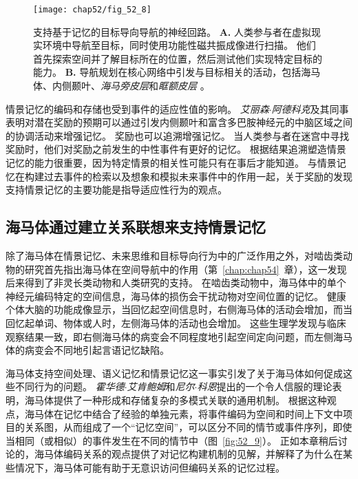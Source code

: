 \begin{figure}[htbp]
	\centering
	\texttt{[image: chap52/fig\_52\_8]}
	\caption{支持基于记忆的目标导向导航的神经回路\cite{brown2016prospective}。
		\textbf{A.} 人类参与者在虚拟现实环境中导航至目标，同时使用功能性磁共振成像进行扫描。
		他们首先探索空间并了解目标所在的位置，然后测试他们实现特定目标的能力。
		\textbf{B.} 导航规划在核心网络中引发与目标相关的活动，包括海马体、内侧颞叶、\textit{海马旁皮层}和\textit{眶额皮层 }。}
	\label{fig:52_8}
\end{figure}


情景记忆的编码和存储也受到事件的适应性值的影响。
\textit{艾丽森$\cdot$阿德科克}及其同事表明对潜在奖励的预期可以通过引发内侧颞叶和富含多巴胺神经元的中脑区域之间的协调活动来增强记忆。
奖励也可以追溯增强记忆。
当人类参与者在迷宫中寻找奖励时，他们对奖励之前发生的中性事件有更好的记忆。
根据结果​​追溯塑造情景记忆的能力很重要，因为特定情景的相关性可能只有在事后才能知道。
与情景记忆在构建过去事件的检索以及想象和模拟未来事件中的作用一起，关于奖励的发现支持情景记忆的主要功能是指导适应性行为的观点。



\subsection{海马体通过建立关系联想来支持情景记忆}

除了海马体在情景记忆、未来思维和目标导向行为中的广泛作用之外，对啮齿类动物的研究首先指出海马体在空间导航中的作用（第~\ref{chap:chap54}~章），这一发现后来得到了非灵长类动物和人类研究的支持。
在啮齿类动物中，海马体中的单个神经元编码特定的空间信息，海马体的损伤会干扰动物对空间位置的记忆。
健康个体大脑的功能成像显示，当回忆起空间信息时，右侧海马体的活动会增加，而当回忆起单词、物体或人时，左侧海马体的活动也会增加。
这些生理学发现与临床观察结果一致，即右侧海马体的病变会不同程度地引起空间定向问题，而左侧海马体的病变会不同地引起言语记忆缺陷。


海马体支持空间处理、语义记忆和情景记忆这一事实引发了关于海马体如何促成这些不同行为的问题。
\textit{霍华德$\cdot$艾肯鲍姆}和\textit{尼尔$\cdot$科恩}提出的一个令人信服的理论表明，海马体提供了一种形成和存储复杂的多模式关联的通用机制。
根据这种观点，海马体在记忆中结合了经验的单独元素，将事件编码为空间和时间上下文中项目的关系图，从而组成了一个“记忆空间”，可以区分不同的情节或事件序列，即使当相同（或相似）的事件发生在不同的情节中（图~\ref{fig:52_9}）。
正如本章稍后讨论的，海马体编码关系的观点提供了对记忆构建机制的见解，并解释了为什么在某些情况下，海马体可能有助于无意识访问但编码关系的记忆过程。


